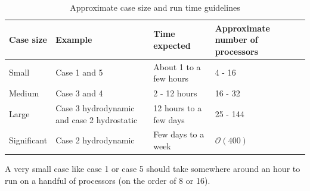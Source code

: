 \documentclass[11pt]{article}
\begin{document}
\begin{table}
\begin{tabularx}{\textwidth}{X X X X}
\hline
\textbf{Case size} & \textbf{Example} & \textbf{Time expected} & \textbf{Approximate number of processors} \\ \hline \hline
Small & Case 1 and 5 & About 1 to a few hours & 4 - 16 \\ \hline
Medium & Case 3 and 4 & 2 - 12 hours & 16 - 32 \\ \hline
Large & Case 3 hydrodynamic and case 2 hydrostatic & 12 hours to a few days & 25 - 144 \\ \hline
Significant & Case 2 hydrodynamic & Few days to a week & $\mathcal{O}(400)$ \\ \hline
\end{tabularx}
\caption{Approximate case size and run time guidelines}
\label{table:runTime}
\end{table}

A very small case like case 1 or case 5 should take somewhere around an hour to run on a handful of processors (on the order of 8 or 16).


\end{document}
